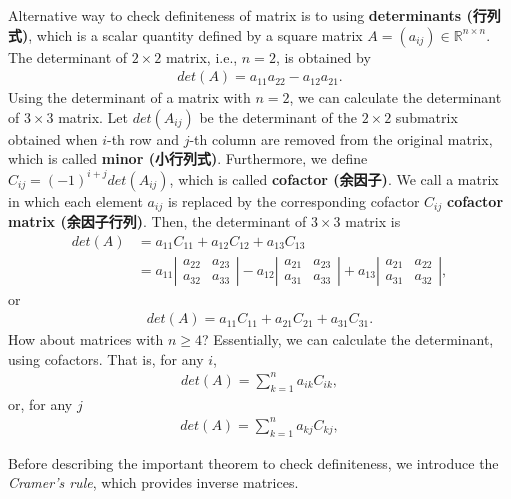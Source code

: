 \documentclass[
  12pt,
]{article}
\begin{document}
Alternative way to check definiteness of matrix is to using \textbf{determinants (行列式)},
which is a scalar quantity defined by a square matrix \(A = (a_{ij}) \in \mathbb{R}^{n \times n}\).
The determinant of \(2 \times 2\) matrix, i.e., \(n = 2\), is obtained by
\begin{align*}
  det(A) = a_{11}a_{22} - a_{12}a_{21}.
\end{align*}
Using the determinant of a matrix with \(n = 2\), we can calculate the determinant of \(3 \times 3\) matrix.
Let \(det(A_{ij})\) be the determinant of the \(2 \times 2\) submatrix
obtained when \(i\)-th row and \(j\)-th column are removed from the original matrix,
which is called \textbf{minor (小行列式)}.
Furthermore, we define \(C_{ij} = (-1)^{i+j} det(A_{ij})\), which is called \textbf{cofactor (余因子)}.
We call a matrix in which each element \(a_{ij}\) is replaced by the corresponding cofactor \(C_{ij}\) \textbf{cofactor matrix (余因子行列)}.
Then, the determinant of \(3 \times 3\) matrix is
\begin{align*}
  det(A) 
  &= a_{11} C_{11} + a_{12} C_{12} + a_{13} C_{13}  \\
  &= a_{11} 
  \left| \begin{array}{cc}
    a_{22} & a_{23} \\
    a_{32} & a_{33}
  \end{array} \right| 
  - a_{12}
  \left| \begin{array}{cc}
    a_{21} & a_{23} \\
    a_{31} & a_{33}
  \end{array} \right| 
  + a_{13}
  \left| \begin{array}{cc}
    a_{21} & a_{22} \\
    a_{31} & a_{32}
  \end{array} \right|, 
\end{align*}
or
\begin{align*}
  det(A) = a_{11} C_{11} + a_{21} C_{21} + a_{31} C_{31}.
\end{align*}
How about matrices with \(n \ge 4\)?
Essentially, we can calculate the determinant, using cofactors. That is, for any \(i\),
\begin{align*}
  det(A) = \sum_{k = 1}^n a_{ik} C_{ik},
\end{align*}
or, for any \(j\)
\begin{align*}
  det(A) = \sum_{k = 1}^n a_{kj} C_{kj},
\end{align*}

Before describing the important theorem to check definiteness,
we introduce the \emph{Cramer's rule}, which provides inverse matrices.
\end{document}
